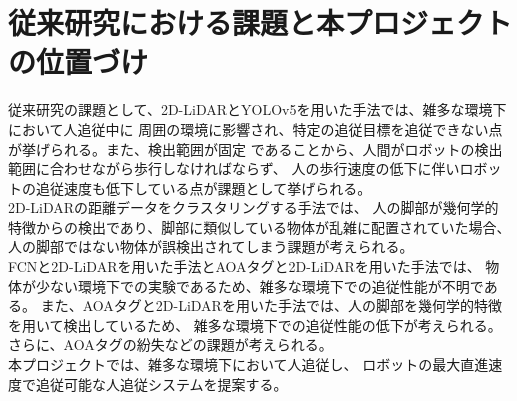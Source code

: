 \clearpage

\section{従来研究における課題と本プロジェクトの位置づけ}
従来研究の課題として、2D-LiDARとYOLOv5を用いた手法では、雑多な環境下において人追従中に
周囲の環境に影響され、特定の追従目標を追従できない点が挙げられる。また、検出範囲が固定
であることから、人間がロボットの検出範囲に合わせながら歩行しなければならず、
人の歩行速度の低下に伴いロボットの追従速度も低下している点が課題として挙げられる。\\ \indent
2D-LiDARの距離データをクラスタリングする手法では、
人の脚部が幾何学的特徴からの検出であり、脚部に類似している物体が乱雑に配置されていた場合、
人の脚部ではない物体が誤検出されてしまう課題が考えられる。\\ \indent
FCNと2D-LiDARを用いた手法とAOAタグと2D-LiDARを用いた手法では、
物体が少ない環境下での実験であるため、雑多な環境下での追従性能が不明である。
また、AOAタグと2D-LiDARを用いた手法では、人の脚部を幾何学的特徴を用いて検出しているため、
雑多な環境下での追従性能の低下が考えられる。さらに、AOAタグの紛失などの課題が考えられる。\\ \indent
本プロジェクトでは、雑多な環境下において人追従し、
ロボットの最大直進速度で追従可能な人追従システムを提案する。